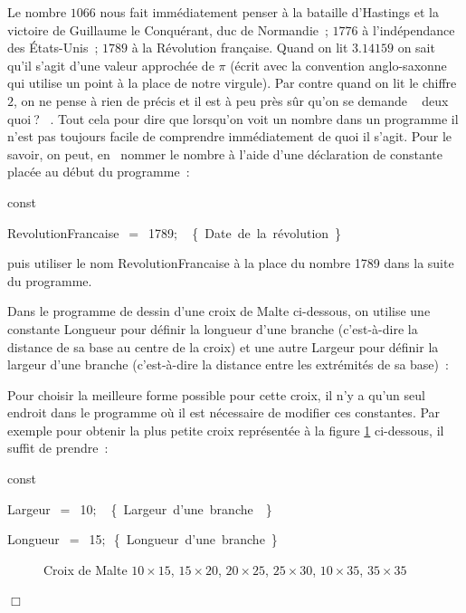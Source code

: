 Le nombre $1066$ nous fait immédiatement penser à la bataille d'Hastings et la victoire de Guillaume le Conquérant, duc de Normandie~;
$1776$ à l'indépendance des États-Unis~; $1789$ à la Révolution
française. Quand on lit $3.14159$ on sait qu'il s'agit d'une valeur approchée de $\pi$
(écrit avec la convention anglo-saxonne qui utilise un point à la place de notre virgule).
Par contre quand on lit le chiffre $2$, on ne pense à rien de précis et il est à peu près sûr
qu'on se demande 
\raisebox{0.25ex}{$\scriptscriptstyle \boldmath\ll$}~%
deux quoi$\:$?%
~\raisebox{0.25ex}{$\scriptscriptstyle \boldmath\gg$}.
Tout cela pour dire que lorsqu'on voit un nombre dans un
programme il n'est pas toujours facile de comprendre immédiatement de quoi il s'agit. Pour le savoir,
on peut, en \pascal\ nommer le nombre à l'aide d'une déclaration de constante placée au
début du programme~:

\vspace{\neglskip}\mbox{\blc  \blk\idt  \mcl const\idt }\par 
\vspace{\neglskip}\mbox{\blc  \blk\blk\idt  RevolutionFrancaise\ $=$\ 1789$;$\ \ \cmt\{\ Date de la révolution\ \}}\par 

\noindent puis utiliser le nom {\idt RevolutionFrancaise} à la place du nombre 
{\small\rm 1789} dans la suite du programme.


\begin{exemple}{\rm
Dans le programme de dessin d'une croix de Malte ci-dessous, on
utilise une constante {\idt Longueur} pour définir la longueur d'une
branche (c'est-à-dire la distance de sa base au centre de la croix) et
une autre {\idt Largeur} pour définir la largeur d'une branche
(c'est-à-dire la distance entre les extrémités de sa base)~:\hfill\\[22mm]
%
\vspace*{-22mm}%


Pour choisir la meilleure forme possible pour
cette croix, il n'y a qu'un seul endroit dans le programme où il est nécessaire
de modifier ces constantes. Par exemple pour obtenir la plus petite croix représentée à la
figure \ref{fig:crmadiff} ci-dessous, il suffit de prendre~:\par
\vspace{\neglskip}\mbox{\blc  \blk\idt  \mcl const\idt }\par 
\vspace{\neglskip}\mbox{\blc  \blk\blk\idt  Largeur\ $=$\ 10$;$\ \ \cmt  \{\ Largeur\ d{'}une\ branche\ \ \}\idt }\par 
\vspace{\neglskip}\mbox{\blc  \blk\blk\idt  Longueur\ $=$\ 15$;$\ \cmt  \{\ Longueur\ d{'}une\ branche\ \}\idt }\par 
\begin{figure}[htbp]
 \caption{Croix de Malte $10\times 15$, $15\times 20$, $20\times 25$, $25\times 30$, 
 $10\times 35$, $35\times 35$}
 \label{fig:crmadiff}
\end{figure}
\noindent $\Box$ }\end{exemple}


